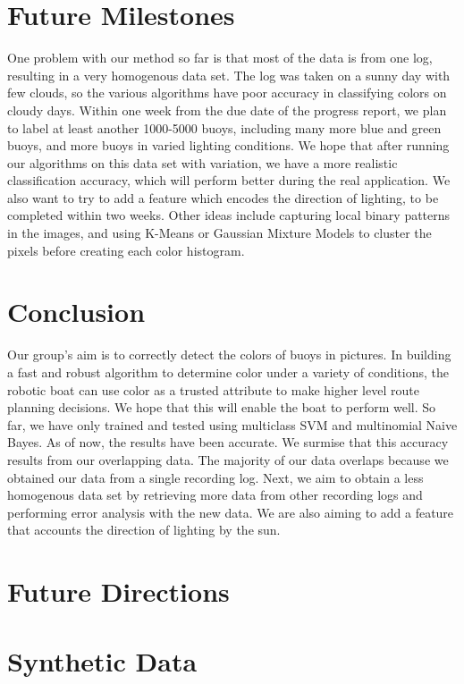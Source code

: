 \documentclass{article} %
\begin{document}
\section{Future Milestones}

One problem with our method so far is that most of the data is from one log, resulting in a very homogenous data set. The log was taken on a sunny day with few clouds, so the various algorithms have poor accuracy in classifying colors on cloudy days. Within one week from the due date of the progress report, we plan to label at least another 1000-5000 buoys, including many more blue and green buoys, and more buoys in varied lighting conditions. We hope that after running our algorithms on this data set with variation, we have a more realistic classification accuracy, which will perform better during the real application. We also want to try to add a feature which encodes the direction of lighting, to be completed within two weeks. Other ideas include capturing local binary patterns in the images, and using K-Means or Gaussian Mixture Models to cluster the pixels before creating each color histogram.

\section{Conclusion}
Our group's aim is to correctly detect the colors of buoys in pictures. In building a fast and robust algorithm to determine color under a variety of conditions, the robotic boat can use color as a trusted attribute to make higher level route planning decisions. We hope that this will enable the boat to perform well. So far, we have only trained and tested using multiclass SVM and multinomial Naive Bayes. As of now, the results have been accurate. We surmise that this accuracy results from our overlapping data. The majority of our data overlaps because we obtained our data from a single recording log.  Next, we aim to obtain a less homogenous data set by retrieving more data from other recording logs and performing error analysis with the new data. We are also aiming to add a feature that accounts the direction of lighting by the sun.

\section{Future Directions}


\section{Synthetic Data}
\end{document}
